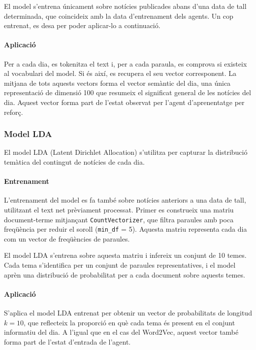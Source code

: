 \documentclass[12pt,a4paper,twoside]{book}
\begin{document}
El model s'entrena únicament sobre notícies publicades abans d'una data de tall determinada, que coincideix amb la data d'entrenament dels agents. Un cop entrenat, es desa per poder aplicar-lo a continuació.

\paragraph{Aplicació}

Per a cada dia, es tokenitza el text i, per a cada paraula, es comprova si existeix al vocabulari del model. Si és així, es recupera el seu vector corresponent. La mitjana de tots aquests vectors forma el vector semàntic del dia, una única representació de dimensió 100 que resumeix el significat general de les notícies del dia. Aquest vector forma part de l'estat observat per l'agent d'aprenentatge per reforç.

\vspace{1em}

\subsubsection{Model LDA}

El model LDA (Latent Dirichlet Allocation) s'utilitza per capturar la distribució temàtica del contingut de notícies de cada dia.

\paragraph{Entrenament}

L'entrenament del model es fa també sobre notícies anteriors a una data de tall, utilitzant el text net prèviament processat. Primer es construeix una matriu document-terme mitjançant \texttt{CountVectorizer}, que filtra paraules amb poca freqüència per reduir el soroll (\texttt{min\_df} = 5). Aquesta matriu representa cada dia com un vector de freqüències de paraules.

El model LDA s'entrena sobre aquesta matriu i infereix un conjunt de 10 temes. Cada tema s'identifica per un conjunt de paraules representatives, i el model aprèn una distribució de probabilitat per a cada document sobre aquests temes.


\paragraph{Aplicació}

S'aplica el model LDA entrenat per obtenir un vector de probabilitats de longitud $k=10$, que reflecteix la proporció en què cada tema és present en el conjunt informatiu del dia. A l'igual que en el cas del Word2Vec, aquest vector també forma part de l'estat d'entrada de l'agent.
\end{document}
